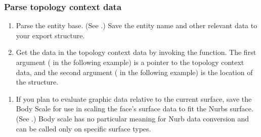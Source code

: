 \documentclass[letterpaper,12pt,english,openany,oneside]{sphinxmanual}
\begin{document}
\subsubsection{Parse topology context data}
\label{\detokenize{Plugins_A3D_API:parse-topology-context-data}}\begin{enumerate}
%
\item {} 
Parse the entity base. (See .) Save the entity name and other relevant data to your export structure.

\item {} 
Get the data in the topology context data by invoking the  function. The first argument ( in the following example) is a pointer to the topology context data, and the second argument ( in the following example) is the location of the  structure.

\end{enumerate}

\begin{sphinxVerbatim}[commandchars=\\\{\}]
 
    
\end{sphinxVerbatim}
\begin{enumerate}
%
\setcounter{enumi}{2}
\item {} 
If you plan to evaluate graphic data relative to the current surface, save the Body Scale for use in scaling the face’s surface data to fit the Nurbs surface. (See .) Body scale has no particular meaning for Nurb data conversion and can be called only on specific surface types.

\end{enumerate}
\end{document}
